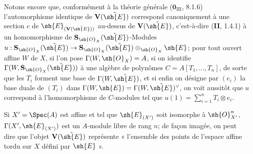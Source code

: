 
Notons encore que, conformément à la théorie générale ($\mathbf{0}_{\mathrm{III}}$, 8.1.6) l'automorphisme identique de $\mathbf V(\check{\sh{E}})$ correspond canoniquement à une section $c$ de $\sh{E}_{(\mathbf V(\check{\sh{E}}))}$ au-dessus de $\mathbf V(\check{\sh{E}})$, c'est-à-dire (\textbf{II}, 1.4.1) à un homomorphisme de $\mathbf S_{\sh{O}_X}(\check{\sh{E}})$-Modules $u:\mathbf S_{\sh{O}_X}(\check{\sh{E}})\to\mathbf S_{\sh{O}_X}(\check{\sh{E}})\otimes_{\sh{O}_X}\sh{E}$; pour tout ouvert affine $W$ de $X$, si l'on pose $\Gamma(W,\sh{O}_X)=A$, si on identifie $\Gamma(W,\mathbf S_{\sh{O}_X}(\check{\sh{E}}))$ à une algèbre de polynômes $C=A[T_1,\ldots,T_n]$, de sorte que les $T_i$ forment une base de $\Gamma(W,\check{\sh{E}})$, et si enfin on désigne par $(e_i)$ la base duale de $(T_i)$ dans $\Gamma(W,\sh{E})=\Gamma(W,\check{\sh{E}})^\vee$, on voit aussitôt que $u$ correspond à l'homomorphisme de $C$-modules tel que $u(1)=\sum_{i=1}^n T_i\otimes e_i$.

Si $X'=\Spec(A)$ est affine et tel que $\sh{E}_{(X')}$ soit isomorphe à $\sh{O}_{X'}^n$, $\Gamma(X',\sh{E}_{(X')})$ est un $A$-module libre de rang $n$; de façon imagée, on peut dire que l'objet $\mathbf V(\check{\sh{E}})$ représente « l'ensemble des points de l'espace affine tordu sur $X$ défini par $\sh{E}$ ».

